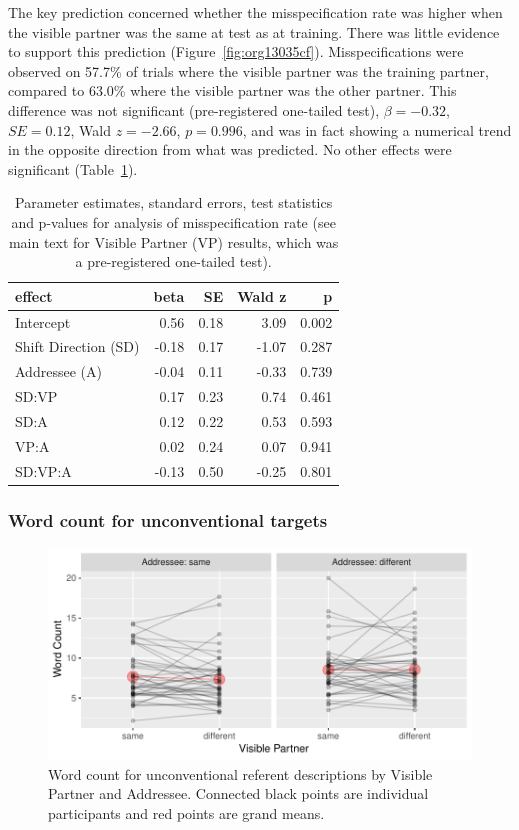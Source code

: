 \documentclass[natbib,man,a4paper]{apa6}
\begin{document}
The key prediction concerned whether the misspecification rate was higher when the visible partner was the same at test as at training. There was little evidence to support this prediction (Figure~\ref{fig:org13035cf}). Misspecifications were observed on 
57.7\%
of trials where the visible partner was the training partner, compared to 
63.0\%
where the visible partner was the other partner.
This difference was not significant (pre-registered one-tailed test), 
\(\beta = -0.32\), \(SE = 0.12\), Wald \(z = -2.66\), \(p = 0.996\), and was in fact showing a numerical trend in the opposite direction from what was predicted. No other effects were significant (Table~\ref{tbl:exp3-lmem}).

\begin{table}[ht]
\centering
\caption{Parameter estimates, standard errors, test statistics and p-values for analysis of misspecification rate (see main text for Visible Partner (VP) results, which was a pre-registered one-tailed test).} 
\label{tbl:exp3-lmem}
\begin{tabular}{lrrrr}
  \hline
effect & beta & SE & Wald z & p \\ 
  \hline
Intercept & 0.56 & 0.18 & 3.09 & 0.002 \\ 
  Shift Direction (SD) & -0.18 & 0.17 & -1.07 & 0.287 \\ 
  Addressee (A) & -0.04 & 0.11 & -0.33 & 0.739 \\ 
  SD:VP & 0.17 & 0.23 & 0.74 & 0.461 \\ 
  SD:A & 0.12 & 0.22 & 0.53 & 0.593 \\ 
  VP:A & 0.02 & 0.24 & 0.07 & 0.941 \\ 
  SD:VP:A & -0.13 & 0.50 & -0.25 & 0.801 \\ 
   \hline
\end{tabular}
\end{table}

\subsubsection*{Word count for unconventional targets}
\label{sec:org3f3e27b}

\begin{figure}[htbp]
\centering
\includegraphics[width=.9\linewidth]{exp3/img/exp3-wc-plot.pdf}
\caption{\label{fig:org357c072}
Word count for unconventional referent descriptions by Visible Partner and Addressee. Connected black points are individual participants and red points are grand means.}
\end{figure}
\end{document}

